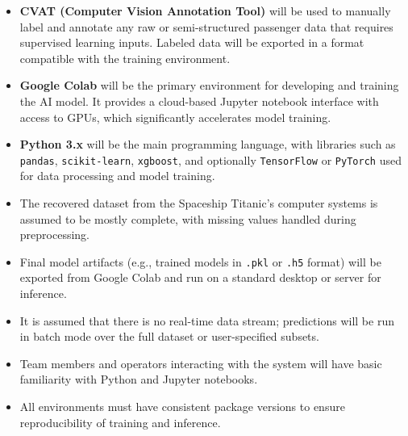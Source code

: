 \documentclass[15pt]{article}
\begin{document}
\begin{itemize}
    \item \textbf{CVAT (Computer Vision Annotation Tool)} will be used to manually label and annotate any raw or semi-structured passenger data that requires supervised learning inputs. Labeled data will be exported in a format compatible with the training environment.
    
    \item \textbf{Google Colab} will be the primary environment for developing and training the AI model. It provides a cloud-based Jupyter notebook interface with access to GPUs, which significantly accelerates model training.
    
    \item \textbf{Python 3.x} will be the main programming language, with libraries such as \texttt{pandas}, \texttt{scikit-learn}, \texttt{xgboost}, and optionally \texttt{TensorFlow} or \texttt{PyTorch} used for data processing and model training.
    
    \item The recovered dataset from the Spaceship Titanic's computer systems is assumed to be mostly complete, with missing values handled during preprocessing.
    
    \item Final model artifacts (e.g., trained models in \texttt{.pkl} or \texttt{.h5} format) will be exported from Google Colab and run on a standard desktop or server for inference.
    
    \item It is assumed that there is no real-time data stream; predictions will be run in batch mode over the full dataset or user-specified subsets.
    
    \item Team members and operators interacting with the system will have basic familiarity with Python and Jupyter notebooks.
    
    \item All environments must have consistent package versions to ensure reproducibility of training and inference.
\end{itemize}
\end{document}
